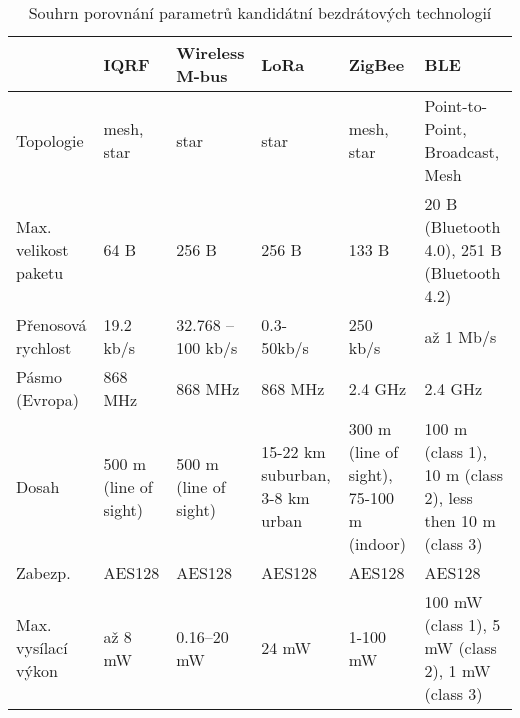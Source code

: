 \begin{longtable}{|p{1.5cm}||p{1.3cm}|p{1.5cm}|p{1.4cm}|p{1.5cm}|p{2.8cm}|}
    \caption{Souhrn porovnání parametrů kandidátní bezdrátových technologií}
    \label{table:shrnutiTechnologii} \\ 
    \hline
 & \textbf{IQRF}         & \textbf{Wireless M-bus} & \textbf{LoRa}                 & \textbf{ZigBee}                          & \textbf{BLE}                                              \\ \hline \hline
    Topologie               & mesh, star            & star                  & star                            & mesh, star                               & Point-to-Point, Broadcast, Mesh                           \\ \hline
    Max. velikost paketu & 64 B                  & 256 B                 & 256 B                           & 133 B                                    & 20 B (Bluetooth 4.0), 251 B (Bluetooth 4.2)               \\ \hline
    Přenosová rychlost              & 19.2 kb/s             & 32.768 – 100 kb/s     & 0.3-50kb/s                      & 250 kb/s                                 & až 1 Mb/s                                              \\ \hline
    Pásmo (Evropa)          & 868 MHz               & 868 MHz               & 868 MHz                         & 2.4 GHz                                  & 2.4 GHz                                                   \\ \hline
    Dosah                  & 500 m (line of sight) & 500 m (line of sight) & 15-22 km suburban, 3-8 km urban & 300 m (line of sight), 75-100 m (indoor) & 100 m (class 1), 10 m (class 2), less then 10 m (class 3) \\ \hline
    Zabezp.               & AES128               & AES128               & AES128                         & AES128                                  & AES128                                                   \\ \hline
    Max. vysílací výkon & až 8 mW            & 0.16–20 mW            & 24 mW                           & 1-100 mW                                 & 100 mW (class 1), 5 mW (class 2), 1 mW (class 3)          \\ \hline

\end{longtable}


